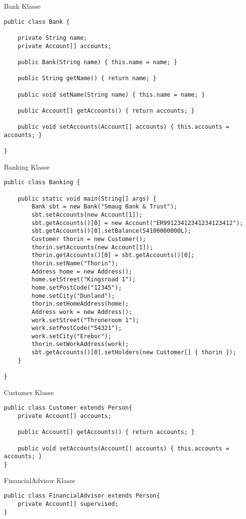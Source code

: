 \documentclass[12pt,a4paper,oneside,ngerman]{article}
\begin{document}
Bank Klasse
\begin{lstlisting}
public class Bank {
	
	private String name;
	private Account[] accounts;

	public Bank(String name) { this.name = name; }
	
	public String getName() { return name; }

	public void setName(String name) { this.name = name; }

	public Account[] getAccounts() { return accounts; }

	public void setAccounts(Account[] accounts) { this.accounts = accounts; }

}

\end{lstlisting}

Banking Klasse
\begin{lstlisting}
public class Banking {
	
	public static void main(String[] args) {
		Bank sbt = new Bank("Smaug Bank & Trust");
		sbt.setAccounts(new Account[1]);
		sbt.getAccounts()[0] = new Account("ER99123412341234123412");
		sbt.getAccounts()[0].setBalance(54100000000L);
		Customer thorin = new Customer();
		thorin.setAccounts(new Account[1]);
		thorin.getAccounts()[0] = sbt.getAccounts()[0];
		thorin.setName("Thorin");
		Address home = new Address();
		home.setStreet("Kingsroad 1");
		home.setPostCode("12345");
		home.setCity("Dunland");
		thorin.setHomeAddress(home);
		Address work = new Address();
		work.setStreet("Throneroom 1");
		work.setPostCode("54321");
		work.setCity("Erebor");
		thorin.setWorkAddress(work);
		sbt.getAccounts()[0].setHolders(new Customer[] { thorin });
	}

}

\end{lstlisting}

Customer Klasse
\begin{lstlisting}
public class Customer extends Person{
	private Account[] accounts;

	public Account[] getAccounts() { return accounts; }
	
	public void setAccounts(Account[] accounts) { this.accounts = accounts; }
}

\end{lstlisting}

FinancialAdvisor Klasse
\begin{lstlisting}
public class FinancialAdvisor extends Person{
    private Account[] supervised;
}

\end{lstlisting}
\end{document}
